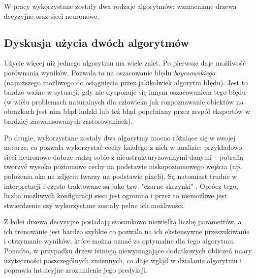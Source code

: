 W pracy wykorzystane zostały dwa rodzaje algorytmów: wzmacniane drzewa decyzyjne oraz sieci neuronowe.
\FloatBarrier



\FloatBarrier
\subsection{Dyskusja użycia dwóch algorytmów}
\label{subsec:dyskusja-2algo}

Użycie więcej niż jednego algorytmu ma wiele zalet. 
Po pierwsze daje możliwość porównania wyników. Pozwala to na oszacowanie błędu \textit{bayesowskiego} (najniższego możliwego do osiągnięcia przez jakikolwiek algorytm błędu). Jest to bardzo ważne w sytuacji, gdy nie dysponuje się innym oszacowaniem tego błędu (w wielu problemach naturalnych dla człowieka jak rozpoznawanie obiektów na obrazkach jest nim błąd ludzki lub też błąd popełniany przez zespół ekspertów w bardziej zaawansowanych zastosowaniach).

Po drugie, wykorzystane zostały dwa algorytmy mocno różniące się w swojej naturze, co pozwala wykorzystać cechy każdego z nich w analizie: przykładowo sieci neuronowe dobrze radzą sobie z nieustrukturyzowanymi danymi -- potrafią tworzyć wysoko poziomowe cechy na podstawie niskopoziomowego wejścia (np. położenia oka na zdjęciu twarzy na podstawie pixeli). Są natomiast trudne w interpretacji i często traktowane są jako tzw. "czarne skrzynki" . Oprócz tego, liczba możliwych konfiguracji sieci jest ogromna i przez to niemożliwe jest stwierdzenie czy wykorzystane zostały pełne ich możliwości.

Z kolei drzewa decyzyjne posiadają stosunkowo niewielką liczbę parametrów, a ich trenowanie jest bardzo szybkie co pozwala na ich ekstensywne przeszukiwanie i otrzymanie wyników, które można uznać za optymalne dla tego algorytmu.
Ponadto, w przypadku drzew istnieją niewymagające dodatkowych obliczeń miary użyteczności poszczególnych zmiennych, co daje wgląd w działanie algorytmu i poprawia intuicyjne zrozumienie jego predykcji.






